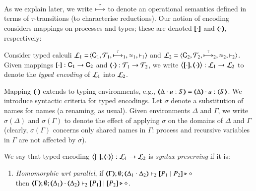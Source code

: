 \documentclass[runningheads]{llncs}
\begin{document}
{%

As we explain later, we write $\stackrel{\tau}{\longmapsto}$ to denote an operational semantics defined in terms of
$\tau$-transitions (to characterise reductions).
Our notion of encoding considers mappings on processes 
and types; these are denoted $[\!\![\cdot]\!\!]$ and $(\!\!\langle\cdot\rangle\!\!)$, respectively: %

\begin{definition}%
\label{def:tenc}
        Consider typed calculi
        $\mathcal{L}_1=\!\langle \mathsf{C}_1, {\cal{T}}_1, \stackrel{\tau}{\longmapsto}_1, \approx_1, \vdash_1 \rangle$
        and
        $\mathcal{L}_2=\langle \mathsf{C}_2, {\cal{T}}_2, \stackrel{\tau}{\longmapsto}_2, \approx_2, \vdash_2 \rangle$.
	Given mappings $[\!\![\cdot]\!\!]: \mathsf{C}_1 \to \mathsf{C}_2$ and
	$(\!\!\langle\cdot\rangle\!\!): {\cal{T}}_1 \to {\cal{T}}_2$, 
	we write 
		$\enco{\map{\cdot}, \mapt{\cdot}} : 
	\tyl{L}_1 \to \tyl{L}_2$ to denote the \emph{typed encoding} of $\mathcal{L}_1$ into $\mathcal{L}_2$.
\end{definition}


Mapping $(\!\!\langle\cdot\rangle\!\!)$ extends to typing
environments, e.g., $\mapt{\Delta \cat u:S} = \mapt{\Delta} \cat u:\mapt{S}$.
We introduce syntactic criteria for typed encodings.
Let $\sigma$ denote a substitution of names for names (a renaming, as usual). Given environments $\Delta$ and $\Gamma$,
we write $\sigma(\Delta)$ and $\sigma(\Gamma)$ to denote the effect of applying $\sigma$ on the 
domains of $\Delta$ and $\Gamma$
(clearly, $\sigma(\Gamma)$ concerns only shared names in $\Gamma$: process and recursive variables in $\Gamma$ are not affected by $\sigma$). 


\begin{definition}%
	\label{def:sep}
	We say that 
	typed encoding 
	$\enco{\map{\cdot}, \mapt{\cdot}}: \tyl{L}_1 \to \tyl{L}_2$ is \emph{syntax preserving}
	if it is:
	
	\begin{enumerate}[1.]
		\item	\emph{Homomorphic wrt parallel},   if 
		$\mapt{\Gamma}; \emptyset; \mapt{\Delta_1 \cat \Delta_2} \proves_2 \map{P_1 \Par P_2} \hastype \Proc$ \\
		then 
		$\mapt{\Gamma}; \emptyset; \mapt{\Delta_1} \cat \mapt{\Delta_2} \proves_2 \map{P_1} \Par \map{P_2} \hastype \Proc$.


\end{enumerate}
\end{definition}}
\end{document}
